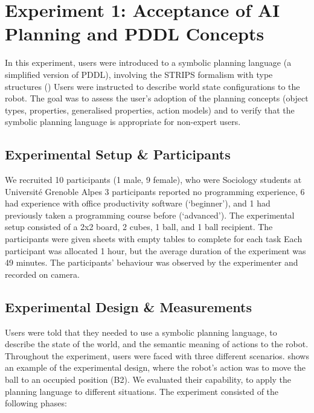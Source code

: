 
\section{Experiment 1: Acceptance of AI Planning and PDDL Concepts}\label{sec:Exp1}

In this experiment, users were introduced to a symbolic planning language (a simplified version of PDDL), involving the STRIPS formalism with type structures ()
Users were instructed to describe world state configurations to the robot.
The goal was to assess the user's adoption of the planning concepts (object types, properties, generalised properties, action models) and to verify that the symbolic planning language is appropriate for non-expert users.
\subsection{Experimental Setup \& Participants}
We recruited 10 participants (1 male, 9 female), who were Sociology students at Universit\'{e} Grenoble Alpes
3 participants reported no programming experience, 6  had experience with office productivity software (`beginner'), and 1 had previously taken a programming course before (`advanced').
%
The experimental setup consisted of a 2x2 board, 2 cubes, 1 ball, and 1 ball recipient.
The participants were given sheets with empty tables to complete for each task
Each participant was allocated 1 hour, but the average duration of the experiment was 49 minutes.
The participants' behaviour was observed by the experimenter and recorded on camera. 

 
\subsection{Experimental Design \& Measurements}
Users were told that they needed to use a symbolic planning language, to describe the state of the world, and the semantic meaning of actions to the robot. 
Throughout the experiment, users were faced with three different scenarios. 
 shows an example of the experimental design, where the robot's action was to move the ball to an occupied position (B2). 
We evaluated their capability, to apply the planning language to different situations.
The experiment consisted of the following phases:

